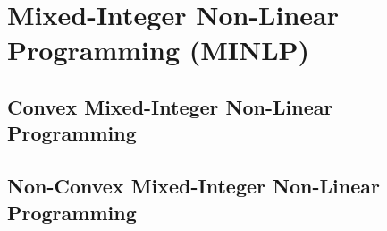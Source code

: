 \section{Mixed-Integer Non-Linear Programming (MINLP)}
\subsection{Convex Mixed-Integer Non-Linear Programming}

\subsection{Non-Convex Mixed-Integer Non-Linear Programming}





%
%
%
